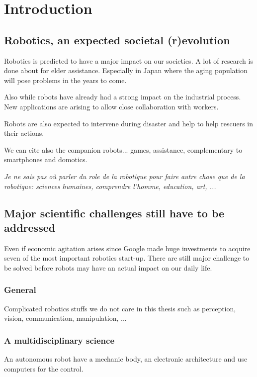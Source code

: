 
\chapter{Introduction} %


\section{Robotics, an expected societal (r)evolution} %

Robotics is predicted to have a major impact on our societies. 
A lot of research is done about for elder assistance. Especially in Japan where the aging population will pose problems in the years to come.

Also while robots have already had a strong impact on the industrial process. New applications are arising to allow close collaboration with workers.

Robots are also expected to intervene during disaster and help to help rescuers in their actions.

We can cite also the companion robots... games, assistance, complementary to smartphones and domotics. 


\emph{Je ne sais pas où parler du role de la robotique pour faire autre chose que de la robotique: sciences humaines, comprendre l'homme, education, art, ...}

\section{Major scientific challenges still have to be addressed} %

Even if economic agitation arises since Google made huge investments to acquire seven of the most important robotics start-up. There are still major challenge to be solved before robots may have an actual impact on our daily life.


\subsection{General} %
Complicated robotics stuffs we do not care in this thesis such as perception, vision, communication, manipulation, ...

\subsection{A multidisciplinary science} %
An autonomous robot have a mechanic body, an electronic architecture and use computers for the control. 

